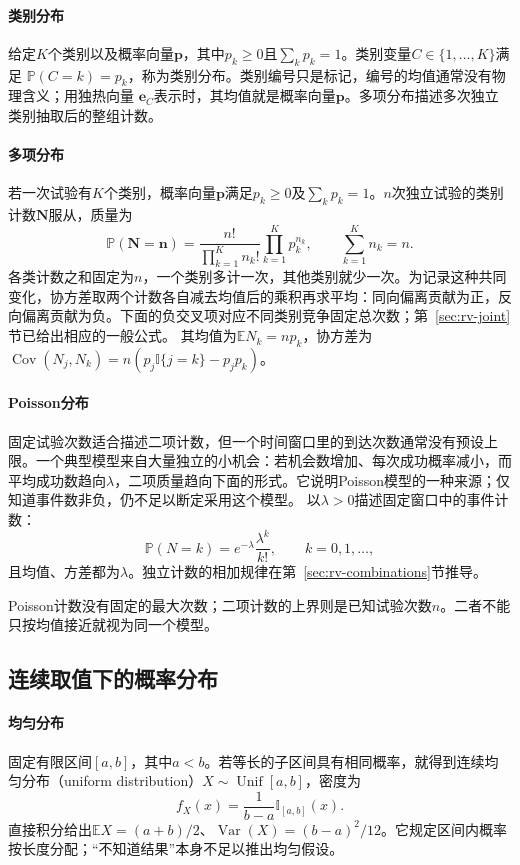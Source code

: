 \paragraph{类别分布}
给定\(K\)个类别以及概率向量\(\bm p\)，其中\(p_k\geq0\)且\(\sum_kp_k=1\)。类别变量\(C\in\{1,\ldots,K\}\)满足
\(\mathbb P(C=k)=p_k\)，称为类别分布。类别编号只是标记，编号的均值通常没有物理含义；用独热向量
\(\bm e_C\)表示时，其均值就是概率向量\(\bm p\)。多项分布描述多次独立类别抽取后的整组计数。

\paragraph{多项分布}
若一次试验有\(K\)个类别，概率向量\(\bm{p}\)满足\(p_k\geq0\)及\(\sum_kp_k=1\)。\(n\)次独立试验的类别计数\(\bm{N}\)服从，质量为
\[ \mathbb{P}(\bm{N}=\bm{n})
  =\frac{n!}{\prod_{k=1}^{K}n_k!}\prod_{k=1}^{K}p_k^{n_k},\qquad\sum_{k=1}^{K}n_k=n. \]
各类计数之和固定为\(n\)，一个类别多计一次，其他类别就少一次。为记录这种共同变化，协方差取两个计数各自减去均值后的乘积再求平均：同向偏离贡献为正，反向偏离贡献为负。下面的负交叉项对应不同类别竞争固定总次数；第~\ref{sec:rv-joint}节已给出相应的一般公式。
其均值为\(\mathbb{E}N_k=np_k\)，协方差为\(\operatorname{Cov}(N_j,N_k)=n(p_j\mathbb{I}\{j=k\}-p_jp_k)\)。

\paragraph{Poisson分布}
固定试验次数适合描述二项计数，但一个时间窗口里的到达次数通常没有预设上限。一个典型模型来自大量独立的小机会：若机会数增加、每次成功概率减小，而平均成功数趋向\(\lambda\)，二项质量趋向下面的形式。它说明Poisson模型的一种来源；仅知道事件数非负，仍不足以断定采用这个模型。
以\(\lambda>0\)描述固定窗口中的事件计数：
\[ \mathbb{P}(N=k)
  =e^{-\lambda}\frac{\lambda^k}{k!},\qquad k=0,1,\ldots, \]
且均值、方差都为\(\lambda\)。独立计数的相加规律在第~\ref{sec:rv-combinations}节推导。

Poisson计数没有固定的最大次数；二项计数的上界则是已知试验次数\(n\)。二者不能只按均值接近就视为同一个模型。

\subsection{连续取值下的概率分布}
\paragraph{均匀分布}
固定有限区间\([a,b]\)，其中\(a<b\)。若等长的子区间具有相同概率，就得到连续均匀分布（uniform distribution）\(X\sim\operatorname{Unif}[a,b]\)，密度为
\[ f_X(x)=\frac{1}{b-a}\mathbb I_{[a,b]}(x). \]
直接积分给出\(\mathbb E X=(a+b)/2\)、\(\operatorname{Var}(X)=(b-a)^2/12\)。它规定区间内概率按长度分配；“不知道结果”本身不足以推出均匀假设。

